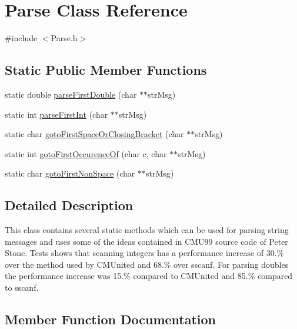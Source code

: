 \hypertarget{classParse}{}\section{Parse Class Reference}
\label{classParse}


{\ttfamily \#include $<$Parse.\+h$>$}

\subsection*{Static Public Member Functions}
\begin{DoxyCompactItemize}
\item 
static double \hyperlink{classParse_abb2c6feb8d0f3aa33fc65456b52c2996}{parse\+First\+Double} (char $\ast$$\ast$str\+Msg)
\item 
static int \hyperlink{classParse_ad7ff96efeada853f0d4c51e5344e6edb}{parse\+First\+Int} (char $\ast$$\ast$str\+Msg)
\item 
static char \hyperlink{classParse_ad77357913848f872385f44ec531526d0}{goto\+First\+Space\+Or\+Closing\+Bracket} (char $\ast$$\ast$str\+Msg)
\item 
static int \hyperlink{classParse_a2f02549c9c6b0de82e38ce5b12654b54}{goto\+First\+Occurence\+Of} (char c, char $\ast$$\ast$str\+Msg)
\item 
static char \hyperlink{classParse_a20b93ee95332798ad4947f4a898320ca}{goto\+First\+Non\+Space} (char $\ast$$\ast$str\+Msg)
\end{DoxyCompactItemize}


\subsection{Detailed Description}
This class contains several static methods which can be used for parsing string messages and uses some of the ideas contained in C\+MU\textquotesingle{}99 source code of Peter Stone. Tests shows that scanning integers has a performance increase of 30.\% over the method used by C\+M\+United and 68.\% over sscanf. For parsing doubles the performance increase was 15.\% compared to C\+M\+United and 85.\% compared to sscanf. 

\subsection{Member Function Documentation}
